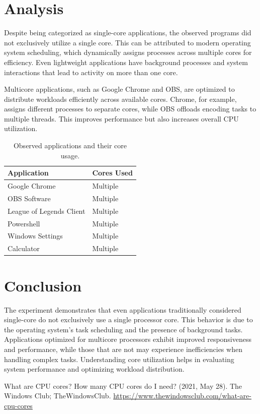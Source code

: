 \documentclass{article}
\begin{document}
\section{Analysis}
Despite being categorized as single-core applications, the observed programs did not exclusively utilize a single core. This can be attributed to modern operating system scheduling, which dynamically assigns processes across multiple cores for efficiency. Even lightweight applications have background processes and system interactions that lead to activity on more than one core.

Multicore applications, such as Google Chrome and OBS, are optimized to distribute workloads efficiently across available cores. Chrome, for example, assigns different processes to separate cores, while OBS offloads encoding tasks to multiple threads. This improves performance but also increases overall CPU utilization.

\begin{table}[H]
\centering
\begin{tabular}{ll}
\toprule
Application & Cores Used \\
\midrule
Google Chrome & Multiple \\
OBS Software & Multiple \\
League of Legends Client & Multiple \\
Powershell & Multiple \\
Windows Settings & Multiple \\
Calculator & Multiple \\
\bottomrule
\end{tabular}
\caption{Observed applications and their core usage.}
\label{tab:core_usage}
\end{table}

\section{Conclusion}
The experiment demonstrates that even applications traditionally considered single-core do not exclusively use a single processor core. This behavior is due to the operating system's task scheduling and the presence of background tasks. Applications optimized for multicore processors exhibit improved responsiveness and performance, while those that are not may experience inefficiencies when handling complex tasks. Understanding core utilization helps in evaluating system performance and optimizing workload distribution.

\begin{thebibliography}{9}
What are CPU cores? How many CPU cores do I need? (2021, May 28). The Windows Club; TheWindowsClub. \url{https://www.thewindowsclub.com/what-are-cpu-cores}
\end{thebibliography}
\end{document}

